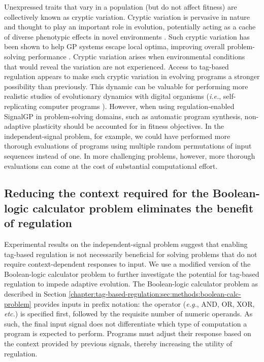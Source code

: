 Unexpressed traits that vary in a population (but do not affect fitness) are collectively known as cryptic variation. 
Cryptic variation is pervasive in nature and thought to play an important role in evolution, potentially acting as a cache of diverse phenotypic effects in novel environments \citep{gibson_uncovering_2004,paaby_cryptic_2014}.
Such cryptic variation has been shown to help GP systems escape local optima, improving overall problem-solving performance \citep{turner_neutral_2015}.
Cryptic variation arises when environmental conditions that would reveal the variation are not experienced. 
Access to tag-based regulation appears to make such cryptic variation in evolving programs a stronger possibility than previously.
This dynamic can be valuable for performing more realistic studies of evolutionary dynamics with digital organisms (\textit{i.e.}, self-replicating computer programs \citep{wilke_biology_2002}).
However, when using regulation-enabled SignalGP in problem-solving domains, such as automatic program synthesis, non-adaptive plasticity should be accounted for in fitness objectives.
In the independent-signal problem, for example, we could have performed more thorough evaluations of programs using multiple random permutations of input sequences instead of one.
In more challenging problems, however, more thorough evaluations can come at the cost of substantial computational effort. 

\begin{raggedright}
\subsection{Reducing the context required for the Boolean-logic calculator problem eliminates the benefit of regulation}
\end{raggedright}

Experimental results on the independent-signal problem suggest that enabling tag-based regulation is not necessarily beneficial for solving problems that do not require context-dependent responses to input. 
We use a modified version of the Boolean-logic calculator problem to further investigate the potential for tag-based regulation to impede adaptive evolution. 
The Boolean-logic calculator problem as described in Section \ref{chapter:tag-based-regulation:sec:methods:boolean-calc-problem} provides inputs in prefix notation: the operator (\textit{e.g.}, AND, OR, XOR, \textit{etc.}) is specified first, followed by the requisite number of numeric operands. 
As such, the final input signal does not differentiate which type of computation a program is expected to perform.
Programs must adjust their response based on the context provided by previous signals, thereby increasing the utility of regulation. 

